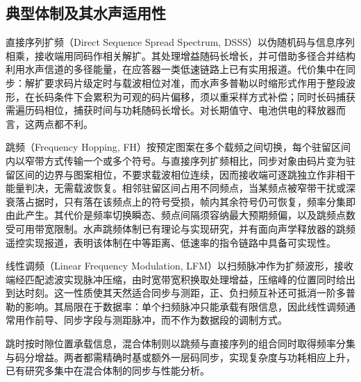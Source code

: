 \subsection{典型体制及其水声适用性}

直接序列扩频（Direct Sequence Spread Spectrum, DSSS）以伪随机码与信息序列相乘，接收端用同码作相关解扩。其处理增益随码长增长，并可借助多径合并结构利用水声信道的多径能量，在应答器一类低速链路上已有实用报道\cite{chenDesignUnderwaterAcoustic2012}。代价集中在同步：解扩要求码片级定时与载波相位对准，而水声多普勒以时缩形式作用于整段波形，在长码条件下会累积为可观的码片偏移，须以重采样方式补偿；同时长码捕获需遍历码相位，捕获时间与功耗随码长增长\cite{freitagAnalysisChannelEffects2001}。对长期值守、电池供电的释放器而言，这两点都不利。

跳频（Frequency Hopping, FH）按预定图案在多个载频之间切换，每个驻留区间内以窄带方式传输一个或多个符号。与直接序列扩频相比，同步对象由码片变为驻留区间的边界与图案相位，不要求载波相位连续，因而接收端可逐跳独立作非相干能量判决，无需载波恢复\cite{LiuChuanQingJiZhongTiaoPinTongXinJiShuXingNengFenXi2006,SongDongPoTiaoPinXuLieSheJiYanJiuXianZhuangYuWeiLaiFaZhan2024}。相邻驻留区间占用不同频点，当某频点被窄带干扰或深衰落占据时，只有落在该频点上的符号受损，帧内其余符号仍可恢复，频率分集即由此产生\cite{LiangZhaoZhengJiYuLiuErHaiMFSKTiaoPinTongXinDeKangBuFenPinDaiGanRaoXingNengYuShiXian1995,YueLingShuiShengTiaoPinTongXinXiTongXingNengFangZhenYanJiu2009}。其代价是频率切换瞬态、频点间隔须容纳最大预期频偏，以及跳频点数受可用带宽限制。水声跳频体制已有理论与实现研究，并有面向声学释放器的跳频遥控实现报道，表明该体制在中等距离、低速率的指令链路中具备可实现性\cite{LiBoDuoYongHuShuiShengFHMFSKTongXinJiShuLiLunYuShiXianYanJiu2018,NiXiaoYuanJiYuFHMFSKDeShuiShengTongXinYanJiu2015,liuFHFSKRemoteControl2021}。

线性调频（Linear Frequency Modulation, LFM）以扫频脉冲作为扩频波形，接收端经匹配滤波实现脉冲压缩，由时宽带宽积换取处理增益，压缩峰的位置同时给出到达时刻。这一性质使其天然适合同步与测距，正、负扫频互补还可抵消一阶多普勒的影响。其局限在于数据率：单个扫频脉冲只能承载有限信息，因此线性调频通常用作前导、同步字段与测距脉冲，而不作为数据段的调制方式。

跳时按时隙位置承载信息，混合体制则以跳频与直接序列的组合同时取得频率分集与码分增益。两者都需精确时基或额外一层码同步，实现复杂度与功耗相应上升，已有研究多集中在混合体制的同步与性能分析\cite{FengJianLiFHDSHunHeKuoPinJiShuZaiShuiShengTongXinZhongDeYingYongYanJiu2007,YangWenGeFeiYuanChunBianMaDeFeiXiangGanHunHeDSSFHMFSKDiaoZhiKuoPinTongXinXiTongZaiBuFenDaiKuanDuoPinGanRaoShiDeXingNengFenXi2001,ZhaoYanLeiFHDSHunHeXiTongXinHaoTongBuJiShuYanJiu2011}。

